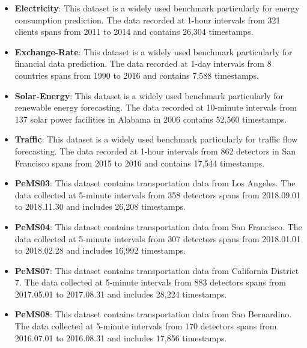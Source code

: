 \documentclass[final,12pt]{elsarticle}
\begin{document}
\begin{itemize}

\item \textbf{Electricity}:  %
This dataset is a widely used benchmark particularly for energy consumption prediction.
The data recorded at 1-hour intervals from 321 clients 
spans from 2011 to 2014 and contains 26,304 timestamps.

\item \textbf{Exchange-Rate}:  %
This dataset is a widely used benchmark particularly for financial data prediction.
The data recorded at 1-day intervals from 8 countries 
spans from 1990 to 2016 and contains 7,588 timestamps.

\item \textbf{Solar-Energy}:  %
This dataset is a widely used benchmark particularly for renewable energy forecasting.
The data recorded at 10-minute intervals from 137 solar power facilities 
in Alabama in 2006 
contains 52,560 timestamps.

\item \textbf{Traffic}:  %
This dataset is a widely used benchmark particularly for traffic flow forecasting.
The data recorded at 1-hour intervals from 862 detectors 
in San Francisco 
spans from 2015 to 2016 and contains 17,544 timestamps.


\item \textbf{PeMS03}:  %
This dataset contains transportation data from Los Angeles.
The data collected at 5-minute intervals from 358 detectors 
spans from 2018.09.01 to 2018.11.30 
and includes 26,208 timestamps.

\item \textbf{PeMS04}:  %
This dataset contains transportation data from San Francisco.
The data collected at 5-minute intervals from 307 detectors 
spans from 2018.01.01 to 2018.02.28 
and includes 16,992 timestamps.

\item \textbf{PeMS07}:  %
This dataset contains transportation data from California District 7.
The data collected at 5-minute intervals from 883 detectors 
spans from 2017.05.01 to 2017.08.31 
and includes 28,224 timestamps.

\item \textbf{PeMS08}:  %
This dataset contains transportation data from San Bernardino.
The data collected at 5-minute intervals from 170 detectors 
spans from 2016.07.01 to 2016.08.31 
and includes 17,856 timestamps.

\end{itemize}
\end{document}
